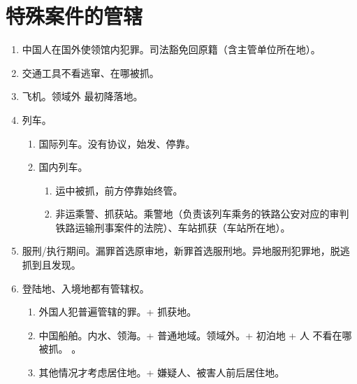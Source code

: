 \section{特殊案件的管辖}
\begin{enumerate}
  \item 中国人在国外使领馆内犯罪。司法豁免回原籍（含主管单位所在地）。
  \item \xjt 交通工具不看逃窜、在哪被抓。
  \item 飞机。领域外 \yjt 最初降落地。
  \item 列车。
        \begin{enumerate}
          \item 国际列车。没有协议，始发、停靠。
          \item 国内列车。
                \begin{enumerate}
                  \item 运中被抓，前方停靠始终管。
                  \item 非运乘警、抓获站。乘警地（负责该列车乘务的铁路公安对应的审判铁路运输刑事案件的法院）、车站抓获（车站所在地）。
                \end{enumerate}
        \end{enumerate}
  \item 服刑/执行期间。漏罪首选原审地，新罪首选服刑地。异地服刑犯罪地，脱逃抓到且发现。
  \item 登陆地、入境地都有管辖权。
        \begin{enumerate}
          \item 外国人犯普遍管辖的罪。+ 抓获地。
          \item 中国船舶。\yi 内水、领海。+ 普通地域。\er 领域外。+ 初泊地 + 人 \yjt 不看在哪被抓。
                。
          \item 其他情况才考虑居住地。+ 嫌疑人、被害人前后居住地。
        \end{enumerate}
\end{enumerate}
